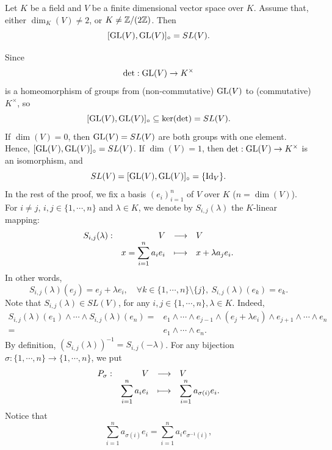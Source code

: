 \begin{theoremenv}\label{thm:5.6.*}
    Let $K$ be a field and $V$ be a finite dimensional vector space over $K$.
    Assume that, either $\dim_{K}(V) \neq 2$, or $K \neq \mathbb{Z} /(2\mathbb{Z})$.
    Then
    $$[\operatorname{\mathrm{GL}}(V), \operatorname{\mathrm{GL}}(V)]_{\circ} = SL(V).$$
\end{theoremenv}
\begin{proofenv}
    Since
    $$\det : \operatorname{\mathrm{GL}}(V) \rightarrow K^\times$$
    is a homeomorphism of groups from (non-commutative) $\operatorname{\mathrm{GL}}(V)$ to (commutative) $K^\times$,
    so
    $$[\operatorname{\mathrm{GL}}(V), \operatorname{\mathrm{GL}}(V)]_{\circ} \subseteq \ker (\det) = SL(V).$$
    If $\dim (V) = 0$, then $\operatorname{\mathrm{GL}}(V) = SL(V)$ are both groups with one element.
    Hence, $[\operatorname{\mathrm{GL}}(V), \operatorname{\mathrm{GL}}(V)]_{\circ} = SL(V)$.
    If $\dim (V) = 1$, then $\det : \operatorname{\mathrm{GL}}(V) \rightarrow K^\times$ is an isomorphism, and
    $$SL(V) = [\operatorname{\mathrm{GL}}(V), \operatorname{\mathrm{GL}}(V)]_{\circ} = \{\operatorname{\mathrm{Id}}_{V}\}.$$
    In the rest of the proof, we fix a basis $(e_i)_{i=1}^{n}$ of $V$ over $K$ ($n = \dim (V)$).
    For $i \neq j$, $i,j \in \{1,\cdots,n\}$ and $\lambda \in K$, we denote by $S_{i,j}(\lambda)$ the $K$-linear mapping:
    $$\begin{array}{rrcl}
        S_{i,j}(\lambda) : & V & \longrightarrow & V\\
        & \displaystyle x = \sum_{i=1}^n a_i e_i & \longmapsto & x + \lambda a_j e_i.
    \end{array}$$
    In other words,
    $$S_{i,j}(\lambda)(e_j) = e_{j} + \lambda e_{i}, \quad \forall k \in \{1,\cdots,n\}\setminus \{j\},\ S_{i,j}(\lambda)(e_{k}) = e_{k}.$$
    Note that $S_{i,j}(\lambda) \in SL(V)$, for any $i,j \in \{1,\cdots, n\}, \lambda \in K$.
    Indeed,
    $$\begin{aligned}
        S_{i,j}(\lambda)(e_1) \wedge \cdots \wedge S_{i,j}(\lambda)(e_n) = & e_1 \wedge \cdots \wedge e_{j-1} \wedge (e_{j} + \lambda e_i) \wedge e_{j + 1} \wedge \cdots \wedge e_{n}\\
        = & e_1 \wedge \cdots \wedge e_{n}.
    \end{aligned}$$
    By definition, $\left(S_{i,j}(\lambda)\right)^{-1} = S_{i,j} (-\lambda)$.
    For any bijection $\sigma : \{1,\cdots,n\} \rightarrow \{1,\cdots,n\}$, we put
    $$\begin{array}{rrcl}
        P_{\sigma} : & V & \longrightarrow & V\\
        & \displaystyle \sum_{i=1}^n a_i e_i & \longmapsto & \displaystyle \sum_{i=1}^n a_{\sigma(i)} e_i.
    \end{array}$$
    Notice that 
    $$\sum_{i=1}^{n} a_{\sigma(i)} e_i = \sum_{i=1}^{n} a_i e_{\sigma^{-1}(i)},$$

\end{proofenv}
